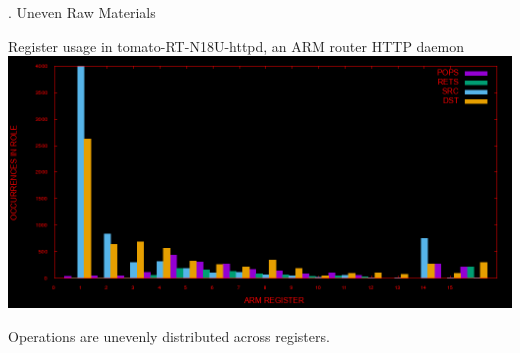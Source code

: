 \documentclass[9pt]{beamer}
\begin{document}
\begin{frame}{\theframenumber. Uneven Raw Materials}

  \begin{center}
    Register usage in tomato-RT-N18U-httpd, an ARM router HTTP daemon
    \includegraphics[width=\textwidth]{../images/tomato.png}
    \end{center}
  Operations are unevenly distributed across registers.

\end{frame}





\end{document}

